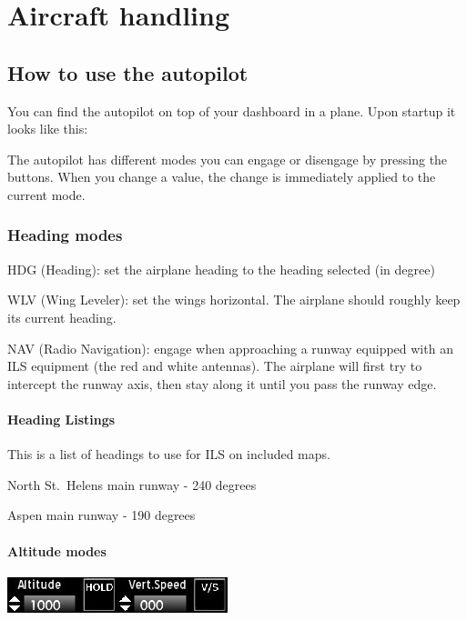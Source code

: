 \hypertarget{aircraft-handling}{%
\chapter{Aircraft handling}\label{aircraft-handling}}

\hypertarget{how-to-use-the-autopilot}{%
\section{How to use the autopilot}\label{how-to-use-the-autopilot}}

You can find the autopilot on top of your dashboard in a plane. Upon
startup it looks like this:

The autopilot has different modes you can engage or disengage by
pressing the buttons. When you change a value, the change is immediately
applied to the current mode.

\hypertarget{heading-modes}{%
\subsection{Heading modes}\label{heading-modes}}

HDG (Heading): set the airplane heading to the heading selected (in
degree)

WLV (Wing Leveler): set the wings horizontal. The airplane should
roughly keep its current heading.

NAV (Radio Navigation): engage when approaching a runway equipped with
an ILS equipment (the red and white antennas). The airplane will first
try to intercept the runway axis, then stay along it until you pass the
runway edge.

\hypertarget{heading-listings}{%
\subsubsection{Heading Listings}\label{heading-listings}}

This is a list of headings to use for ILS on included maps.

North St.~Helens main runway - 240 degrees

Aspen main runway - 190 degrees

\hypertarget{altitude-modes}{%
\subsubsection{Altitude modes}\label{altitude-modes}}

\includegraphics{images/autopilot-alt.jpg}

